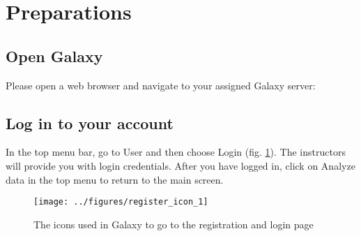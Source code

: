 
\section*{Preparations}
\subsection*{Open Galaxy}
Please open a web browser and navigate to your assigned Galaxy server:

\servers

\subsection*{Log in to your account}
In the top menu bar, go to User and then choose Login (fig. \ref{fig:registration}). The instructors will provide you with login credentials. After you have logged in, click on Analyze data in the top menu to return to the main screen.

\begin{figure}
 \center
  \texttt{[image: ../figures/register\_icon\_1]}
  \caption{\small{ The icons used in Galaxy to go to the registration and login page }}
  \label{fig:registration}
\end{figure}